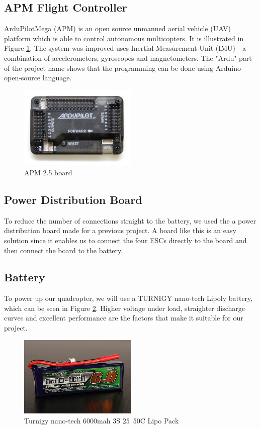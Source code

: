 \subsection{APM Flight Controller}
ArduPilotMega (APM) is an open source unmanned aerial vehicle (UAV) platform which is able to control autonomous multicopters. It is illustrated in Figure \ref{ardupilot}. The system was improved uses Inertial Measurement Unit (IMU) - a combination of accelerometers, gyroscopes and magnetometers. The "Ardu" part of the project name shows that the programming can be done using Arduino open-source language.

\begin{figure}[H]
  \centering
    \includegraphics[width=0.5\textwidth]{images/ardupilot.jpg}
	\caption{APM 2.5 board}
	\label{ardupilot}
\end{figure}

\subsection{Power Distribution Board}
To reduce the number of connections straight to the battery, we used the a power distribution board made for a previous project. A board like this is an easy solution since it enables us to connect the four ESCs directly to the board and then connect the board to the battery.

\subsection{Battery}
To power up our quadcopter, we will use a TURNIGY nano-tech Lipoly battery, which can be seen in Figure \ref{battery}. Higher voltage under load, straighter discharge curves and excellent performance are the factors that make it suitable for our project. 

\begin{figure}[H]
  \centering
    \includegraphics[width=0.5\textwidth]{images/battery.jpg}
	\caption{Turnigy nano-tech 6000mah 3S 25~50C Lipo Pack}
	\label{battery}
\end{figure}

